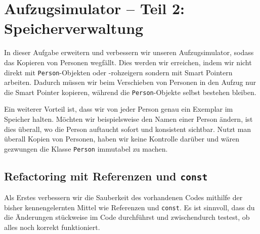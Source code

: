 \section{\ExercisePrefixElevator Aufzugsimulator -- Teil 2: Speicherverwaltung \optional}

\optionaltextbox

In dieser Aufgabe erweitern und verbessern wir unseren Aufzugsimulator, sodass das Kopieren von Personen wegfällt.
Dies werden wir erreichen, indem wir nicht direkt mit \lstinline{Person}-Objekten oder -rohzeigern sondern mit Smart Pointern arbeiten.
Dadurch müssen wir beim Verschieben von Personen in den Aufzug nur die Smart Pointer kopieren, während die \lstinline{Person}-Objekte selbst bestehen bleiben.

Ein weiterer Vorteil ist, dass wir von jeder Person genau ein Exemplar im Speicher halten.
Möchten wir beispielsweise den Namen einer Person ändern, ist dies überall, wo die Person auftaucht sofort und konsistent sichtbar.
Nutzt man überall Kopien von Personen, haben wir keine Kontrolle darüber und wären gezwungen die Klasse \lstinline{Person} immutabel zu machen. \\


\subsection{Refactoring mit Referenzen und \lstinline{const}}
Als Erstes verbessern wir die Sauberkeit des vorhandenen Codes mithilfe der bisher kennengelernten Mittel wie Referenzen und \lstinline{const}.
Es ist sinnvoll, dass du die Änderungen stückweise im Code durchführst und zwischendurch testest, ob alles noch korrekt funktioniert.

